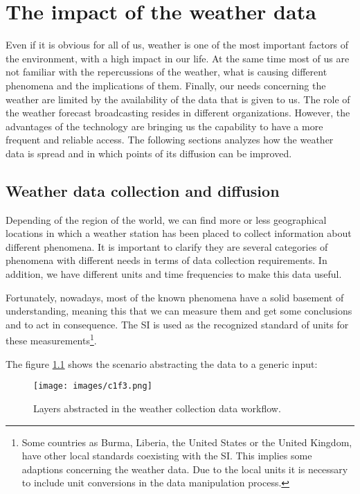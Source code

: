 

\chapter{The impact of the weather data}

Even if it is obvious for all of us, weather is one of the most important factors of the environment, with a high impact in our life. At the same time most of us are not familiar with the repercussions of the weather, what is causing different phenomena and the implications of them. Finally, our needs concerning the weather are limited by the availability of the data that is given to us. The role of the weather forecast broadcasting resides in different organizations. However, the advantages of the technology are bringing us the capability to have a more frequent and reliable access. The following sections analyzes how the weather data is spread and in which points of its diffusion can be improved.

\section{Weather data collection and diffusion}\label{2.1}

Depending of the region of the world, we can find more or less geographical locations in which a weather station has been placed to collect information about different phenomena. It is important to clarify they are several categories of phenomena with different needs in terms of data collection requirements. In addition, we have different units and time frequencies to make this data useful.

Fortunately, nowadays, most of the known phenomena have a solid basement of understanding, meaning this that we can measure them and get some conclusions and to act in consequence.  The \gls{SI} is used as the recognized standard of units for these measurements\footnote{Some countries as Burma, Liberia, the United States or the United Kingdom, have other local standards coexisting with the \gls{SI}. This implies some adaptions concerning the weather data. Due to the local units it is necessary to include unit conversions in the data manipulation process.}.

The figure \ref{f2.1} shows the scenario abstracting the data to a generic input:

\begin{figure}[H]
\centerline{\texttt{[image: images/c1f3.png]}}
\caption{Layers abstracted in the weather collection data workflow.}
\label{f2.1}
\end{figure}


